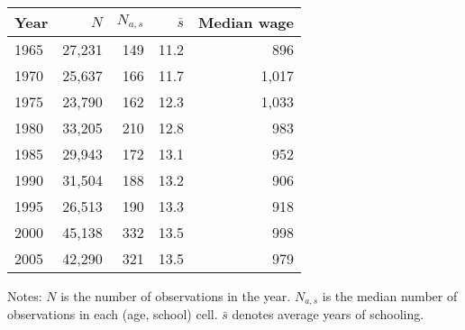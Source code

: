 \begin{tabular}{lrrrr}
\hline
Year & $N$  & $N_{a,s}$  & $\bar{s}$  & Median wage  \\ 
\hline
1965 & 27,231  & 149  & 11.2  & 896  \\ 
1970 & 25,637  & 166  & 11.7  & 1,017  \\ 
1975 & 23,790  & 162  & 12.3  & 1,033  \\ 
1980 & 33,205  & 210  & 12.8  & 983  \\ 
1985 & 29,943  & 172  & 13.1  & 952  \\ 
1990 & 31,504  & 188  & 13.2  & 906  \\ 
1995 & 26,513  & 190  & 13.3  & 918  \\ 
2000 & 45,138  & 332  & 13.5  & 998  \\ 
2005 & 42,290  & 321  & 13.5  & 979  \\ 
\hline
\end{tabular}%

 \vspace{5 mm} 
\small 
Notes: $N$ is the number of observations in the year. 
$N_{a,s}$ is the median number of observations in each (age, school) cell. 
$\bar{s}$ denotes average years of schooling.
\normalsize 
